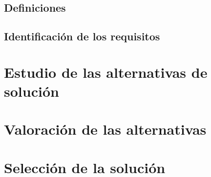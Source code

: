 \documentclass[10pt,a4paper,oldfontcommands]{apuntes}
\begin{document}
\subsection{Definiciones}
\subsection{Identificación de los requisitos}


\section{Estudio de las alternativas de solución}

\section{Valoración de las alternativas}

\section{Selección de la solución}
\end{document}
